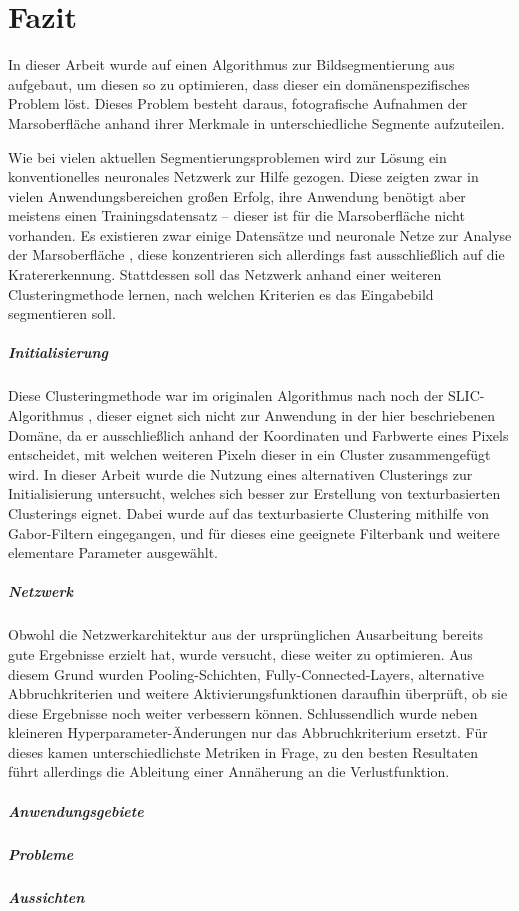 \chapter{Fazit}
\label{chap:fazit}
In dieser Arbeit wurde auf einen Algorithmus zur Bildsegmentierung aus \cite{kanezaki_18} aufgebaut, um diesen so zu optimieren, dass dieser ein domänenspezifisches Problem löst. Dieses Problem besteht daraus, fotografische Aufnahmen der Marsoberfläche anhand ihrer Merkmale in unterschiedliche Segmente aufzuteilen.

Wie bei vielen aktuellen Segmentierungsproblemen wird zur Lösung ein konventionelles neuronales Netzwerk zur Hilfe gezogen. Diese zeigten zwar in vielen Anwendungsbereichen großen Erfolg, ihre Anwendung benötigt aber meistens einen Trainingsdatensatz -- dieser ist für die Marsoberfläche nicht vorhanden. Es existieren zwar einige Datensätze und neuronale Netze zur Analyse der Marsoberfläche \cite{cohen_16}, diese konzentrieren sich allerdings fast ausschließlich auf die Kratererkennung. Stattdessen soll das Netzwerk anhand einer weiteren Clusteringmethode lernen, nach welchen Kriterien es das Eingabebild segmentieren soll.

\paragraph{Initialisierung} Diese Clusteringmethode war im originalen Algorithmus nach \cite{kanezaki_18} noch der SLIC-Algorithmus \cite{achanta_10}, dieser eignet sich nicht zur Anwendung in der hier beschriebenen Domäne, da er ausschließlich anhand der Koordinaten und Farbwerte eines Pixels entscheidet, mit welchen weiteren Pixeln dieser in ein Cluster zusammengefügt wird. In dieser Arbeit wurde die Nutzung eines alternativen Clusterings zur Initialisierung untersucht, welches sich besser zur Erstellung von texturbasierten Clusterings eignet. Dabei wurde auf das texturbasierte Clustering mithilfe von Gabor-Filtern \cite{jain_91} eingegangen, und für dieses eine geeignete Filterbank und weitere elementare Parameter ausgewählt.

\paragraph{Netzwerk} Obwohl die Netzwerkarchitektur aus der ursprünglichen Ausarbeitung \cite{kanezaki_18} bereits gute Ergebnisse erzielt hat, wurde versucht, diese weiter zu optimieren. Aus diesem Grund wurden Pooling-Schichten, Fully-Connected-Layers, alternative Abbruchkriterien und weitere Aktivierungsfunktionen daraufhin überprüft, ob sie diese Ergebnisse noch weiter verbessern können. Schlussendlich wurde neben kleineren Hyperparameter-Änderungen nur das Abbruchkriterium ersetzt. Für dieses kamen unterschiedlichste Metriken in Frage, zu den besten Resultaten führt allerdings die Ableitung einer Annäherung an die Verlustfunktion.

\paragraph{Anwendungsgebiete}

\paragraph{Probleme}

\paragraph{Aussichten}